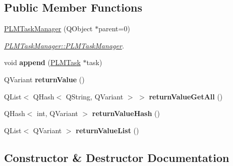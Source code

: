 \subsection*{Public Member Functions}
\begin{DoxyCompactItemize}
\item 
\hyperlink{class_p_l_m_task_manager_adc747855b455e6ee1ff2a4499e374084}{P\+L\+M\+Task\+Manager} (Q\+Object $\ast$parent=0)
\begin{DoxyCompactList}\small\item\em \hyperlink{class_p_l_m_task_manager_adc747855b455e6ee1ff2a4499e374084}{P\+L\+M\+Task\+Manager\+::\+P\+L\+M\+Task\+Manager}. \end{DoxyCompactList}\item 
void {\bfseries append} (\hyperlink{class_p_l_m_task}{P\+L\+M\+Task} $\ast$task)\hypertarget{class_p_l_m_task_manager_ac325aaabace9d6432f12ac31207417b9}{}\label{class_p_l_m_task_manager_ac325aaabace9d6432f12ac31207417b9}

\item 
Q\+Variant {\bfseries return\+Value} ()\hypertarget{class_p_l_m_task_manager_a2831c52e4fd53cdaaad72720f745738e}{}\label{class_p_l_m_task_manager_a2831c52e4fd53cdaaad72720f745738e}

\item 
Q\+List$<$ Q\+Hash$<$ Q\+String, Q\+Variant $>$ $>$ {\bfseries return\+Value\+Get\+All} ()\hypertarget{class_p_l_m_task_manager_a5f9c80e38e7514adc24821e5f18d46c9}{}\label{class_p_l_m_task_manager_a5f9c80e38e7514adc24821e5f18d46c9}

\item 
Q\+Hash$<$ int, Q\+Variant $>$ {\bfseries return\+Value\+Hash} ()\hypertarget{class_p_l_m_task_manager_a730294c4fc26e088b90428b238696a1c}{}\label{class_p_l_m_task_manager_a730294c4fc26e088b90428b238696a1c}

\item 
Q\+List$<$ Q\+Variant $>$ {\bfseries return\+Value\+List} ()\hypertarget{class_p_l_m_task_manager_af891396f186d27d26bd07472e24f958c}{}\label{class_p_l_m_task_manager_af891396f186d27d26bd07472e24f958c}

\end{DoxyCompactItemize}


\subsection{Constructor \& Destructor Documentation}
